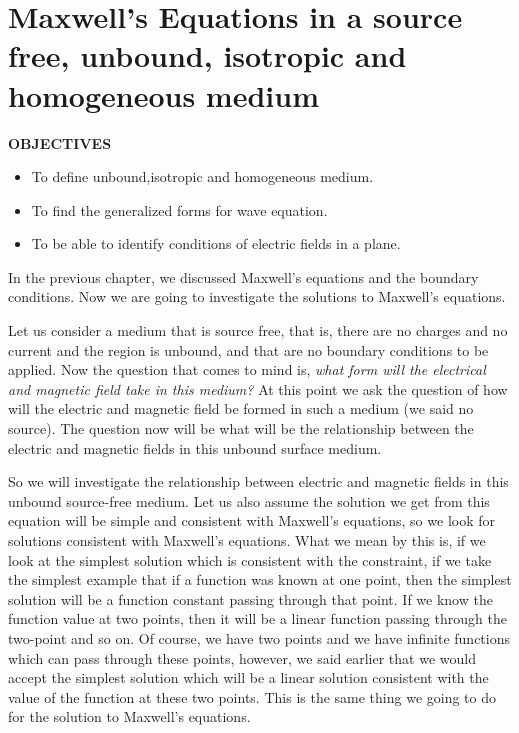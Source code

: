 \chapter{Maxwell's Equations in a source free, unbound, isotropic and homogeneous medium}\label{lec:lec21}
 \textbf{OBJECTIVES}
\begin{itemize}
	\item To define unbound,isotropic and homogeneous medium.
	\item To find the generalized forms for wave equation.
	\item To be able to identify conditions of electric fields in a plane.
	
	
\end{itemize}


In the previous chapter, we discussed Maxwell's equations and the boundary conditions. Now we are going to investigate the solutions to Maxwell's equations.

Let us consider a medium that is source free, that is, there are no charges and no current and the region is unbound, and that are no boundary conditions to be applied. Now the question that comes to mind is, \emph{what form will the electrical and magnetic field take in this medium?} At this point we ask the question of how will the electric and magnetic field be formed in such a medium (we said no source). The question now will be what will be the relationship between the electric and magnetic fields in this unbound surface medium.

So we will investigate the relationship between electric and magnetic fields in this unbound source-free medium. Let us also assume the solution we get from this equation will be simple and consistent with Maxwell's equations, so we look for solutions consistent with Maxwell's equations. What we mean by this is, if we look at the simplest solution which is consistent with the constraint, if we take the simplest example that if a function was known at one point, then the simplest solution will be a function constant passing through that point. If we know the function value at two points, then it will be a linear function passing through the two-point and so on. Of course, we have two points and we have infinite functions which can pass through these points, however, we said earlier that we would accept the simplest solution which will be a linear solution consistent with the value of the function at these two points. This is the same thing we going to do for the solution to Maxwell's equations. 

